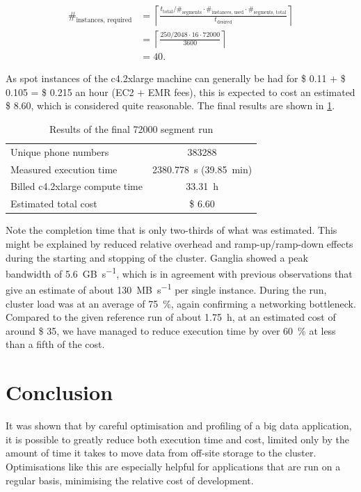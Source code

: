 \documentclass{article}
\begin{document}
\begin{align*}
	\#_{\text{instances, required}} &= \left\lceil\frac{t_{\text{total}} / \#_{\text{segments}} \cdot \#_{\text{instances, used}} \cdot \#_{\text{segments, total}}}{t_{\text{desired}}}\right\rceil \\
	&= \left\lceil\frac{250 / 2048 \cdot 16 \cdot 72000}{3600}\right\rceil \\
	&= 40.
\end{align*}

As spot instances of the c4.2xlarge machine can generally be had for \$ 0.11 + \$ 0.105 = \$ 0.215 an hour (EC2 + EMR fees), this is expected to cost an estimated \$ 8.60, which is considered quite reasonable.
The final results are shown in \cref{tab:final-run}.

\begin{table}[H]
	\centering
	\caption{Results of the final \num{72000} segment run}
	\label{tab:final-run}

	\begin{tabular}{lc}
	\toprule
	Unique phone numbers			& \num{383288} \\
	Measured execution time			& \SI{2380.778}{\second} (\SI{39.85}{\minute}) \\
	Billed c4.2xlarge compute time	& \SI{33.31}{\hour} \\
	Estimated total cost			& \$ 6.60 \\
	\bottomrule
	\end{tabular}
\end{table}

Note the completion time that is only two-thirds of what was estimated.
This might be explained by reduced relative overhead and ramp-up/ramp-down effects during the starting and stopping of the cluster.
Ganglia showed a peak bandwidth of \SI{5.6}{GB\per\second}, which is in agreement with previous observations that give an estimate of about \SI{130}{MB\per\second} per single instance.
During the run, cluster load was at an average of \SI{75}{\percent}, again confirming a networking bottleneck.
Compared to the given reference run of about \SI{1.75}{\hour}, at an estimated cost of around \$ 35, we have managed to reduce execution time by over \SI{60}{\percent} at less than a fifth of the cost.

\section{Conclusion}
It was shown that by careful optimisation and profiling of a big data application, it is possible to greatly reduce both execution time and cost, limited only by the amount of time it takes to move data from off-site storage to the cluster.
Optimisations like this are especially helpful for applications that are run on a regular basis, minimising the relative cost of development.
\end{document}
